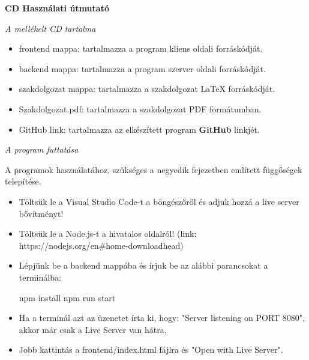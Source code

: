 \pagestyle{empty}

\noindent \textbf{\Large CD Használati útmutató}

\vskip 1cm

\textit{A mellékelt CD tartalma}
\begin{itemize}
\item frontend mappa: tartalmazza a program kliens oldali forráskódját.
\item backend mappa: tartalmazza a program szerver oldali forráskódját.
\item szakdolgozat mappa: tartalmazza a szakdolgozat \LaTeX{} forráskódját.
\item Szakdolgozat.pdf: tartalmazza a szakdolgozat PDF formátumban.
\item GitHub link: tartalmazza az elkészített program \textbf{GitHub} linkjét.
\end{itemize}

\vskip 1cm

\textit{A program futtatása}

\vskip 1cm

A programok használatához, szükséges a negyedik fejezetben említett függőségek telepítése. 

\begin{itemize}
\item Töltsük le a Visual Studio Code-t a böngészőről és adjuk hozzá a live server bővítményt!
\item Töltsük le a Node.js-t a hivatalos oldalról! (link: https://nodejs.org/en\#home-downloadhead)
\item Lépjünk be a backend mappába és írjuk be az alábbi parancsokat a terminálba:
\begin{cpp}
 npm install
 npm run start
\end{cpp}
\item Ha a terminál azt az üzenetet írta ki, hogy: "Server listening on PORT 8080", akkor már csak a Live Server van hátra,
\item Jobb kattintás a frontend/index.html fájlra és "Open with Live Server".
\end{itemize}
